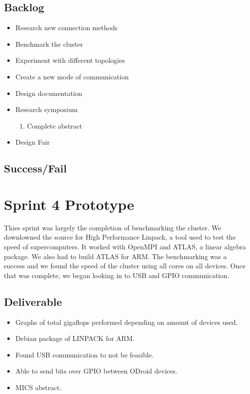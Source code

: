 \subsection{Backlog}

\begin{itemize}
\item Research new connection methods
\item Benchmark the cluster
\item Experiment with different topologies
\item Create a new mode of communication
\item Design documentation
\item Research symposium
\begin{enumerate}
\item Complete abstract
\end{enumerate}
\item Design Fair
\end{itemize}

\subsection{Success/Fail}

\section{Sprint 4 Prototype}

Thies sprint was largely the completion of benchmarking the cluster. We downlowned the source for High Performance Linpack, a tool used to test the speed of supercomputers. It worked with OpenMPI and ATLAS, a linear algebra package. We also had to build ATLAS for ARM. The benchmarking was a success and we found the speed of the cluster using all cores on all devices. Once that was complete, we began looking in to USB and GPIO communication.

\subsection{Deliverable}

\begin{itemize}
\item Graphs of total gigaflops performed depending on amount of devices used.
\item Debian package of LINPACK for ARM.
\item Found USB communication to not be feasible.
\item Able to send bits over GPIO between ODroid devices.
\item MICS abstract.
\end {itemize}

